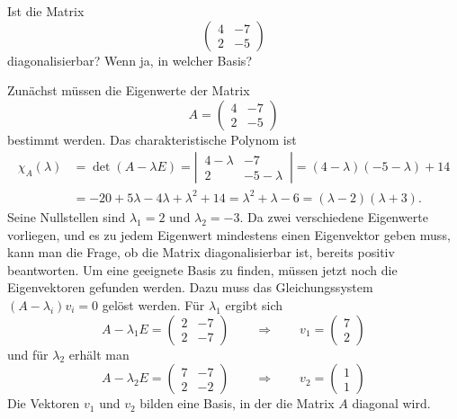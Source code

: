 Ist die Matrix
\[
\begin{pmatrix}
4&-7\\
2&-5
\end{pmatrix}
\]
diagonalisierbar? Wenn ja, in welcher Basis?

\begin{loesung}
Zunächst müssen die Eigenwerte der Matrix
\[
A=
\begin{pmatrix}
4&-7\\
2&-5
\end{pmatrix}
\]
bestimmt werden. Das
charakteristische Polynom ist
\begin{align*}
\chi_A(\lambda)&=
\det(A-\lambda E)
=
\left|\,\begin{matrix}4-\lambda&-7\\2&-5-\lambda\end{matrix}\,\right|
=(4-\lambda)(-5-\lambda)+14\\
&=-20+5\lambda-4\lambda+\lambda^2+14
=\lambda^2+\lambda-6=(\lambda -2)(\lambda +3).
\end{align*}
Seine Nullstellen sind $\lambda_1=2$ und $\lambda_2=-3$. Da zwei
verschiedene Eigenwerte vorliegen, und es zu jedem Eigenwert
mindestens einen Eigenvektor geben muss, kann man die Frage, ob
die Matrix diagonalisierbar ist, bereits positiv beantworten. Um
eine geeignete Basis zu finden, müssen jetzt noch die Eigenvektoren
gefunden werden. Dazu muss das Gleichungssystem $(A-\lambda_i)v_i=0$
gelöst werden. Für $\lambda_1$ ergibt sich
\[
A-\lambda_1 E=\begin{pmatrix}
2&-7\\
2&-7
\end{pmatrix}
\qquad \Rightarrow\qquad v_1=\begin{pmatrix}7\\2\end{pmatrix}
\]
und für $\lambda_2$ erhält man
\[
A-\lambda_2 E=\begin{pmatrix}
7&-7\\
2&-2
\end{pmatrix}
\qquad \Rightarrow\qquad v_2=\begin{pmatrix}1\\1\end{pmatrix}
\]
Die Vektoren $v_1$ und $v_2$ bilden eine Basis, in der die Matrix $A$
diagonal wird.
\end{loesung}

